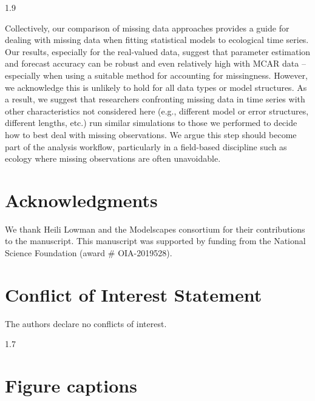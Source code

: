 \documentclass[12pt,english]{article} %
\begin{document}
\begin{linenumbers}
\begin{spacing}{1.9}
\begin{flushleft}
\hspace{1em}Collectively, our comparison of missing data approaches provides a guide for dealing with missing data when fitting statistical models to ecological time series. Our results, especially for the real-valued data, suggest that parameter estimation and forecast accuracy can be robust and even relatively high with MCAR data -- especially when using a suitable method for accounting for missingness. However, we acknowledge this is unlikely to hold for all data types or model structures. As a result, we suggest that researchers confronting missing data in time series with other characteristics not considered here (e.g., different model or error structures, different lengths, etc.) run similar simulations to those we performed to decide how to best deal with missing observations. We argue this step should become part of the analysis workflow, particularly in a field-based discipline such as ecology where missing observations are often unavoidable.

\vspace{-2.5em}

\section*{Acknowledgments}
\vspace{-1em}
We thank Heili Lowman and the Modelscapes consortium for their contributions to the manuscript. This manuscript was supported by funding from the National Science Foundation (award \# OIA-2019528).

\vspace{-2.5em}
\section*{Conflict of Interest Statement}
\vspace{-1em}
The authors declare no conflicts of interest. 



\newpage

%
%
\printbibliography

\newpage
\begin{spacing}{1.7}
\section*{Figure captions}


\end{spacing}
\end{flushleft}
\end{spacing}
\end{linenumbers}
\end{document}
